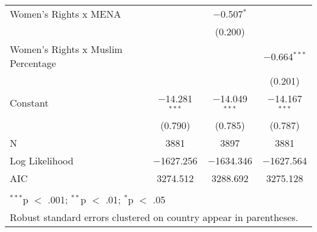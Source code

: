 \begin{table}[!htbp]
\begin{tabular}{@{\extracolsep{5pt}}lccc}
  Women's Rights x MENA &  & $-$0.507$^{*}$ &  \\ 
  &  & (0.200) &  \\ 
  Women's Rights x Muslim Percentage &  &  & $-$0.664$^{***}$ \\ 
  &  &  & (0.201) \\ 
  Constant & $-$14.281$^{***}$ & $-$14.049$^{***}$ & $-$14.167$^{***}$ \\ 
  & (0.790) & (0.785) & (0.787) \\ 
 N & 3881 & 3897 & 3881 \\ 
Log Likelihood & $-$1627.256 & $-$1634.346 & $-$1627.564 \\ 
AIC & 3274.512 & 3288.692 & 3275.128 \\ 
\hline \\[-1.8ex] 
\multicolumn{4}{l}{$^{***}$p $<$ .001; $^{**}$p $<$ .01; $^{*}$p $<$ .05} \\ 
\multicolumn{4}{l}{Robust standard errors clustered on country appear in parentheses.} \\ 
\end{tabular} 
\end{table} 
